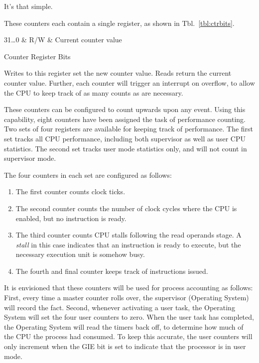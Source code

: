 \documentclass{gqtekspec}
\begin{document}
It's that simple.

These counters each contain a single register, as shown
in Tbl.~\ref{tbl:ctrbits}.
\begin{table}\begin{center}
\begin{bitlist}
31\ldots 0 & R/W & Current counter value\\\hline
\end{bitlist}
\caption{Counter Register Bits}\label{tbl:ctrbits}
\end{center}\end{table}
Writes to this register set the new counter value.  Reads return the current
counter value.  Further, each counter will trigger an interrupt on overflow,
to allow the CPU to keep track of as many counts as are necessary.

These counters can be configured to count upwards upon any event.  Using this
capability, eight counters have been assigned the task of performance counting.
Two sets of four registers are available for keeping track of performance.
The first set tracks all CPU performance, including both supervisor as well as
user CPU statistics.  The second set tracks user mode statistics only, and
will not count in supervisor mode.

The four counters in each set are configured as follows:

\begin{enumerate}
\item The first counter counts clock ticks.
\item The second counter counts the number of clock cycles where the CPU
	is enabled, but no instruction is ready.
\item The third counter counts CPU stalls following the read operands stage.
	A {\em stall} in this case indicates that an instruction is ready to
	execute, but the necessary execution unit is somehow busy.
\item The fourth and final counter keeps track of instructions issued.
\end{enumerate}

It is envisioned that these counters will be used for process accounting as
follows: First, every time a master counter rolls over, the supervisor
(Operating System) will record the fact.  Second, whenever activating a user
task, the Operating System will set the four user counters to zero.  When the
user task has completed, the Operating System will read the timers back off,
to determine how much of the CPU the process had consumed.  To keep this
accurate, the user counters will only increment when the GIE bit is set to
indicate that the processor is in user mode.
\end{document}
